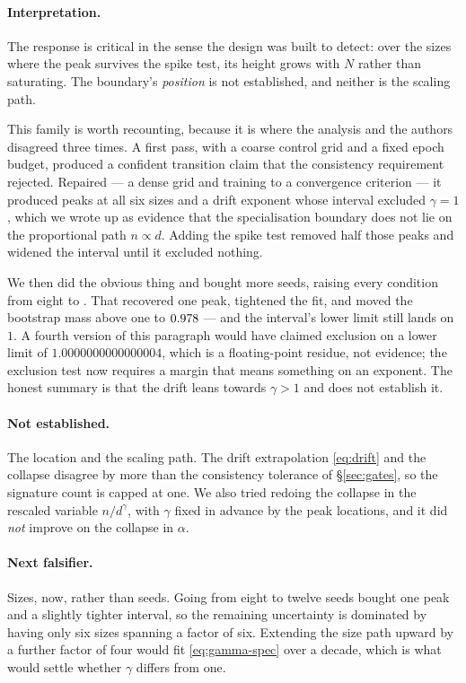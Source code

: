 \paragraph{Interpretation.}
The response is critical in the sense the design was built to detect: over the
sizes where the peak survives the spike test, its height grows with $N$ rather
than saturating. The boundary's \emph{position} is not established, and neither
is the scaling path.

This family is worth recounting, because it is where the analysis and the
authors disagreed three times. A first pass, with a coarse control grid and a
fixed epoch budget, produced a confident transition claim that the consistency
requirement rejected. Repaired --- a dense grid and training to a convergence
criterion --- it produced peaks at all six sizes and a drift exponent whose
interval excluded $\gamma=1$, which we wrote up as evidence that the
specialisation boundary does not lie on the proportional path $n\propto d$.
Adding the spike test removed half those peaks and widened the interval until it
excluded nothing.

We then did the obvious thing and bought more seeds, raising every condition
from eight to \AtlasSpecializationSeeds{}. That recovered one peak, tightened
the fit, and moved the bootstrap mass above one to
$0.978{}$ --- and the interval's lower limit still lands
on $1$. A fourth version of this paragraph would have claimed exclusion on a
lower limit of $1.0000000000000004$, which is a floating-point residue, not
evidence; the exclusion test now requires a margin that means something on an
exponent. The honest summary is that the drift leans towards $\gamma>1$ and does
not establish it.

\paragraph{Not established.}
The location and the scaling path. The drift extrapolation \eqref{eq:drift} and
the collapse disagree by more than the consistency tolerance of
\S\ref{sec:gates}, so the signature count is capped at one. We also tried
redoing the collapse in the rescaled variable $n/d^{\gamma}$, with $\gamma$
fixed in advance by the peak locations, and it did \emph{not} improve on the
collapse in $\alpha$.

\paragraph{Next falsifier.}
Sizes, now, rather than seeds. Going from eight to twelve seeds bought one peak
and a slightly tighter interval, so the remaining uncertainty is dominated by
having only six sizes spanning a factor of six. Extending the size path upward
by a further factor of four would fit \eqref{eq:gamma-spec} over a decade, which
is what would settle whether $\gamma$ differs from one.

